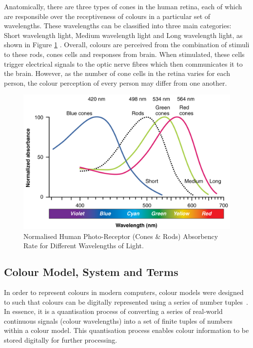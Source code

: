 Anatomically, there are three types of cones in the human retina, each of which
are responsible over the receptiveness of colours in a particular set of
wavelengths. These wavelengths can be classified into three main categories:
Short wavelength light, Medium wavelength light and Long wavelength light, as shown in Figure \ref{fig:visibleSpectrum} \cite{eyespectrum}. Overall, colours are perceived from the combination of stimuli to these rods, cones cells and responses from
brain. When stimulated, these cells trigger electrical signals to the optic nerve
fibres which then communicates it to the brain. However, as the number of cone cells
in the retina varies for each person, the colour perception of every person may differ from one another.


\begin{figure}[hbt!]
 \centering
 \includegraphics[width=.7\textwidth]{image/lit/ColorSensitivity.jpg}
 \caption[Normalised Human Photo-Receptor Absorbency Rate for Different
 Wavelength Lights]{Normalised Human Photo-Receptor (Cones \& Rods) Absorbency
 Rate for Different Wavelengths of Light. %
 }
\label{fig:visibleSpectrum}
\end{figure}


\subsection{Colour Model, System and Terms}
\label{section:colourterm}

In order to represent colours in modern computers, colour models were designed
to such that colours can be digitally represented using a series of number
tuples~\cite{travis1991effective}. In essence, it is a quantisation process of converting
a series of real-world continuous signals (colour wavelengths) into a set of
finite tuples of numbers within a colour model. This quantisation process enables 
colour information to be stored digitally for further processing.


